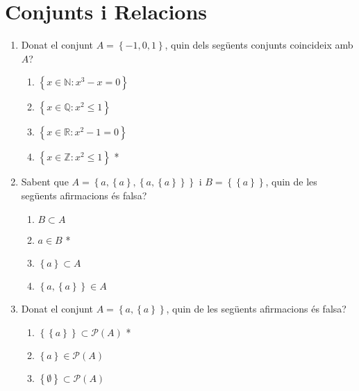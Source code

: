 
\section{Conjunts i Relacions}

\begin{enumerate}
\item Donat el conjunt $A=\left\{ -1,0,1\right\} $, quin dels seg\"{u}ents
conjunts coincideix amb $A$?

\begin{enumerate}
\item $\left\{ x\in\mathbb{N}:x^{3}-x=0\right\} $

\item $\left\{ x\in\mathbb{Q}:x^{2}\leq1\right\} $

\item $\left\{ x\in\mathbb{R}:x^{2}-1=0\right\} $

\item $\left\{ x\in \mathbb{Z}:x^{2}\leq 1\right\} $ *
\end{enumerate}

\item Sabent que $A=\left\{ a,\left\{ a\right\} ,\left\{ a,\left\{ a\right\}
\right\} \right\} $ i $B=\left\{ \left\{ a\right\} \right\} $, quin de les
seg\"{u}ents afirmacions \'{e}s falsa?

\begin{enumerate}
\item $B\subset A$

\item $a\in B$ *

\item $\left\{ a\right\} \subset A$

\item $\left\{ a,\left\{ a\right\} \right\} \in A$
\end{enumerate}

\item Donat el conjunt $A=\left\{ a,\left\{ a\right\} \right\} $, quin de
les seg\"{u}ents afirmacions \'{e}s falsa?

\begin{enumerate}
\item $\left\{ \left\{ a\right\} \right\} \subset \mathcal{P}(A)$ *

\item $\left\{ a\right\} \in\mathcal{P}(A)$

\item $\left\{ \emptyset\right\} \subset\mathcal{P}(A)$


\end{enumerate}
\end{enumerate}
